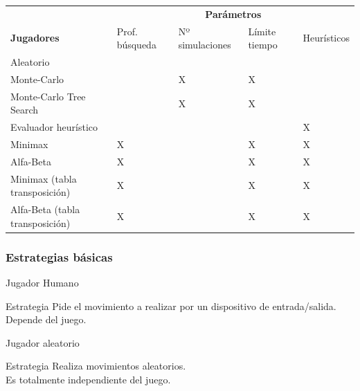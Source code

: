 \documentclass[10pt]{beamer}
\begin{document}
\begin{frame}[squeeze]
{\footnotesize
\begin{center}
\begin{tabular}{lp{1cm}p{1cm}p{1cm}p{1cm}}
\hline
 & \multicolumn{4}{c}{\textbf{Parámetros}}\\
\textbf{Jugadores} & Prof. búsqueda & Nº simulaciones & Límite tiempo & Heurísticos\\
\hline
Aleatorio &  & & & \\
Monte-Carlo & & X & X & \\
Monte-Carlo Tree Search & & X & X  & \\
Evaluador heurístico & & & & X \\ 
Minimax & X & & X & X \\
Alfa-Beta & X & & X & X \\ 
Minimax (tabla transposición) & X & & X & X \\ 
Alfa-Beta (tabla transposición) & X & & X & X \\
\hline
\end{tabular}
\end{center}
}
\end{frame}

\begin{frame}[t]
\frametitle{Estrategias básicas}

{\huge Jugador Humano}
\begin{block}{Estrategia}
Pide el movimiento a realizar por un dispositivo de entrada/salida.
\\
\textcolor{rojo}{Depende del juego.}
\end{block}

\bigskip

\bigskip

{\huge Jugador aleatorio}
\begin{block}{Estrategia}
Realiza movimientos aleatorios.
\\
\textcolor{verde}{Es totalmente independiente del juego.}
\end{block}

\end{frame}
\end{document}
